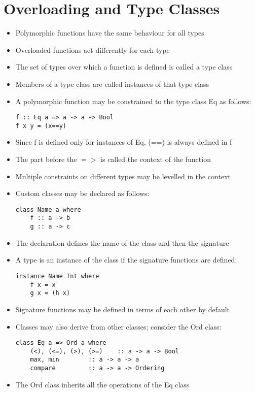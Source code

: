 \documentclass{article}
\begin{document}
\section{Overloading and Type Classes}

\begin{itemize}
\item Polymorphic functions have the same behaviour for all types
\item Overloaded functions act differently for each type
\item The set of types over which a function is defined is called a type class
\item Members of a type class are called instances of that type class
\item A polymorphic function may be constrained to the type class Eq as follows:
\begin{lstlisting}
f :: Eq a => a -> a -> Bool
f x y = (x==y)
\end{lstlisting}
\item Since f is defined only for instances of Eq, (==) is always defined in f
\item The part before the $=>$ is called the context of the function
\item Multiple constraints on different types may be levelled in the context
\item Custom classes may be declared as follows:
\begin{lstlisting}
class Name a where
	f :: a -> b
	g :: a -> c
\end{lstlisting}
\item The declaration defines the name of the class and then the signature
\item A type is an instance of the class if the signature functions are defined:
\begin{lstlisting}
instance Name Int where
	f x = x
	g x = (h x)
\end{lstlisting}
\item Signature functions may be defined in terms of each other by default
\item Classes may also derive from other classes; consider the Ord class:
\begin{lstlisting}
class Eq a => Ord a where
	(<), (<=), (>), (>=)	:: a -> a -> Bool
	max, min		:: a -> a -> a
	compare			:: a -> a -> Ordering
\end{lstlisting}
\item The Ord class inherits all the operations of the Eq class
\end{itemize}
\end{document}
